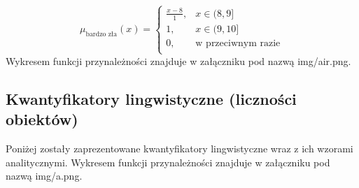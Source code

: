 \documentclass{article}
\begin{document}
\begin{enumerate}
                \begin{equation}
                    \mu_{\text{bardzo zła}}(x) =
                    \begin{cases}
                    \frac{x - 8}{1}, &  x \in (8, 9] \\
                    1, & x \in (9, 10] \\
                    0, & \text{w przeciwnym razie} \\
                    \end{cases}
                \end{equation}
Wykresem funkcji przynależności znajduje w załączniku pod nazwą img/air.png.
\end{enumerate}

\subsection{Kwantyfikatory lingwistyczne (liczności obiektów)}
Poniżej zostały zaprezentowane kwantyfikatory lingwistyczne wraz z ich wzorami analitycznymi. Wykresem funkcji przynależności znajduje w załączniku pod nazwą img/a.png.
\end{document}
